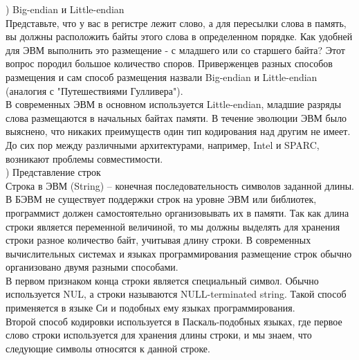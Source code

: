 ) Big-endian и Little-endian \\
Представьте, что у вас в регистре лежит слово, а для пересылки слова в память, вы должны расположить байты этого слова в определенном порядке. Как удобней для ЭВМ выполнить это размещение - с младшего или со старшего байта? Этот вопрос породил большое количество споров. Приверженцев разных способов размещения и сам способ размещения назвали Big-endian и Little-endian (аналогия с "Путешествиями Гулливера"). \\
В современных ЭВМ в основном используется Little-endian, младшие разряды слова размещаются в начальных байтах памяти. В течение эволюции ЭВМ было выяснено, что никаких преимуществ один тип кодирования над другим не имеет. До сих пор между различными архитектурами, например, Intel и SPARC, возникают проблемы совместимости. \\

) Представление строк \\
Строка в ЭВМ (String) – конечная последовательность символов заданной длины. В БЭВМ не существует поддержки строк на уровне ЭВМ или библиотек, программист должен самостоятельно организовывать их в памяти. Так как длина строки является переменной величиной, то мы должны выделять для хранения строки разное количество байт, учитывая длину строки. В современных вычислительных системах и языках программирования размещение строк обычно организовано двумя разными способами. \\
В первом признаком конца строки является специальный символ. Обычно используется NUL, а строки называются NULL-terminated string. Такой способ применяется в языке Си и подобных ему языках программирования. \\
Второй способ кодировки используется в Паскаль-подобных языках, где первое слово строки используется для хранения длины строки, и мы знаем, что следующие символы относятся к данной строке. \\

